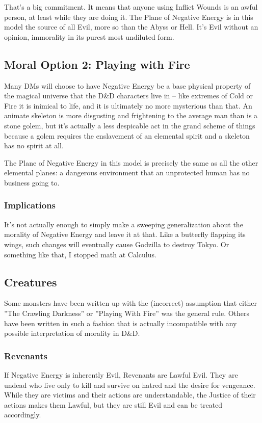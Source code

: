 That's a big commitment. It means that anyone using Inflict Wounds is an awful person, at least while they are doing it. The Plane of Negative Energy is in this model the source of all Evil, more so than the Abyss or Hell. It's Evil without an opinion, immorality in its purest most undiluted form.

\subsection{Moral Option 2: Playing with Fire}

Many DMs will choose to have Negative Energy be a base physical property of the magical universe that the D\&D characters live in -- like extremes of Cold or Fire it is inimical to life, and it is ultimately no more mysterious than that. An animate skeleton is more disgusting and frightening to the average man than is a stone golem, but it's actually a less despicable act in the grand scheme of things because a golem requires the enslavement of an elemental spirit and a skeleton has no spirit at all.

The Plane of Negative Energy in this model is precisely the same as all the other elemental planes: a dangerous environment that an unprotected human has no business going to.

\subsubsection{Implications}

It's not actually enough to simply make a sweeping generalization about the morality of Negative Energy and leave it at that. Like a butterfly flapping its wings, such changes will eventually cause Godzilla to destroy Tokyo. Or something like that, I stopped math at Calculus.

\subsection{Creatures}

Some monsters have been written up with the (incorrect) assumption that either ''The Crawling Darkness'' or ''Playing With Fire'' was the general rule. Others have been written in such a fashion that is actually incompatible with any possible interpretation of morality in D\&D.

\subsubsection{Revenants} If Negative Energy is inherently Evil, Revenants are Lawful Evil. They are undead who live only to kill and survive on hatred and the desire for vengeance. While they are victims and their actions are understandable, the Justice of their actions makes them Lawful, but they are still Evil and can be treated accordingly.

